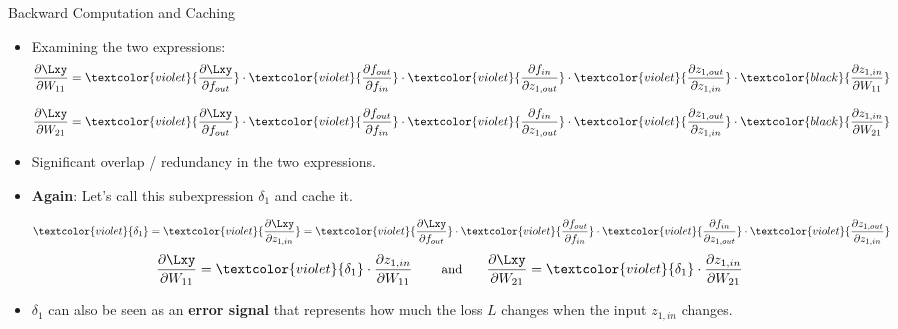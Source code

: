 \documentclass[11pt,compress,t,notes=noshow, xcolor=table]{beamer}
\begin{document}
\begin{frame} {Backward Computation and Caching}
\begin{itemize}
\item Examining the two expressions:
$$\frac{\partial \Lxy}{\partial W_{11}} = 
\textcolor{violet}{\frac{\partial \Lxy}{\partial f_{out}}} \cdot  \textcolor{violet}{\frac{\partial f_{out}}{\partial f_{in}}} \cdot  \textcolor{violet}{\frac{\partial f_{in}}{\partial z_{1,out}}} \cdot  \textcolor{violet}{\frac{\partial z_{1,out}}{\partial z_{1,in}}} \cdot  \textcolor{black}{\frac{\partial z_{1,in}}{\partial W_{11}}}$$

$$\frac{\partial \Lxy}{\partial W_{21}} =     
\textcolor{violet}{\frac{\partial \Lxy}{\partial f_{out}}} \cdot  \textcolor{violet}{\frac{\partial f_{out}}{\partial f_{in}}} \cdot  \textcolor{violet}{\frac{\partial f_{in}}{\partial z_{1,out}}} \cdot  \textcolor{violet}{\frac{\partial z_{1,out}}{\partial z_{1,in}}} \cdot  \textcolor{black}{\frac{\partial z_{1,in}}{\partial W_{21}}}$$

\item Significant overlap / redundancy in the two expressions.
\item \textbf{Again}: Let's call this subexpression $\delta_1$ and cache it.

{\small $$\textcolor{violet}{\delta_1}  = \textcolor{violet}{\frac{\partial \Lxy}{\partial z_{1,in}}} = 
\textcolor{violet}{\frac{\partial \Lxy}{\partial f_{out}}} \cdot  \textcolor{violet}{\frac{\partial f_{out}}{\partial f_{in}}} \cdot  \textcolor{violet}{\frac{\partial f_{in}}{\partial z_{1,out}}} \cdot  \textcolor{violet}{\frac{\partial z_{1,out}}{\partial z_{1,in}}}$$} 
{\small $$\frac{\partial \Lxy}{\partial W_{11}} = \textcolor{violet}{\delta_1} \cdot \frac{\partial z_{1,in}}{\partial W_{11}} \mbox{ \hspace{0.5cm} \small{and} \hspace{0.5cm}} \frac{\partial \Lxy}{\partial W_{21}} = \textcolor{violet}{\delta_1} \cdot \frac{\partial z_{1,in}}{\partial W_{21}} $$}
\item $\delta_1$ can also be seen as an \textbf{error signal} that represents how much the loss $L$ changes when the input $z_{1,in}$ changes.

\end{itemize}
\end{frame}
\end{document}
